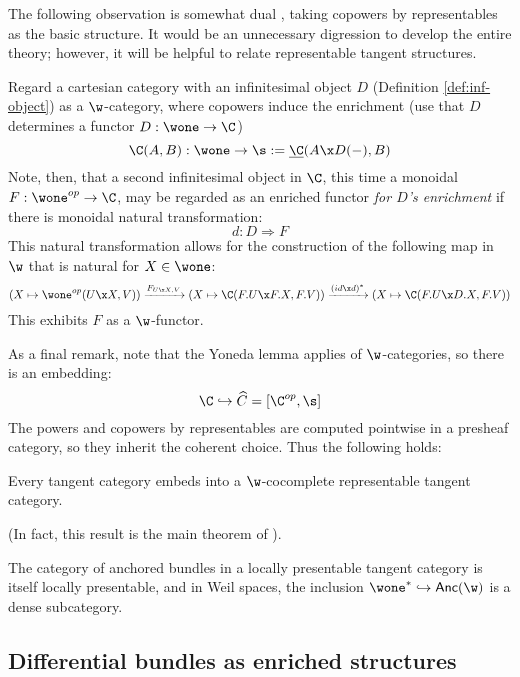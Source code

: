 The following observation is somewhat dual , taking copowers by representables as the basic structure. It would be an unnecessary digression to develop the entire theory; however, it will be helpful to relate representable tangent structures.
\begin{observation}\label{obs:second-enrichment}
	Regard a cartesian category with an infinitesimal object $D$ (Definition \ref{def:inf-object}) as a $\w$-category, where copowers induce the enrichment (use that $D$ determines a functor $D:\wone \to \C$)
	\[
		\C(A,B):\wone \to \s := \underline{\C}(A \x D(-), B)
	\]
	Note, then, that a second infinitesimal object in $\C$, this time a monoidal $F: \wone^{op} \to \C$, may be regarded as an enriched functor \emph{for $D$'s enrichment} if there is monoidal natural transformation:
	\[
		d: D \Rightarrow F
	\]
	This natural transformation allows for the construction of the following map in $\w$ that is natural for $X \in \wone$:
	\[
		(X \mapsto \wone^{op}(U \x X,V)) \xrightarrow[]{F_{U\x X,V}} (X \mapsto \C(F.U\x F.X, F.V)) \xrightarrow[]{(id \x d)^*} (X \mapsto \C(F.U\x D.X, F.V))
	\]
	This exhibits $F$ as a $\w$-functor.
\end{observation}

As a final remark, note that the Yoneda lemma applies of $\w$-categories, so there is an embedding:
\[
	\C \hookrightarrow \widehat{C} = [\C^{op},\s]
\]
The powers and copowers by representables are computed pointwise in a presheaf category, so they inherit the coherent choice. Thus the following holds:
\begin{corollary}
	Every tangent category embeds into a $\w$-cocomplete representable tangent category.
\end{corollary}
(In fact, this result is the main theorem of \cite{Garner2018}).
\begin{corollary}
	The category of anchored bundles in a locally presentable tangent category is itself locally presentable, and in Weil spaces, the inclusion $\wone^* \hookrightarrow \mathsf{Anc}(\w)$ is a dense subcategory.
\end{corollary}



\subsection*{Differential bundles as enriched structures}%
\label{sub:differential-bundles-as-enriched-structures}

